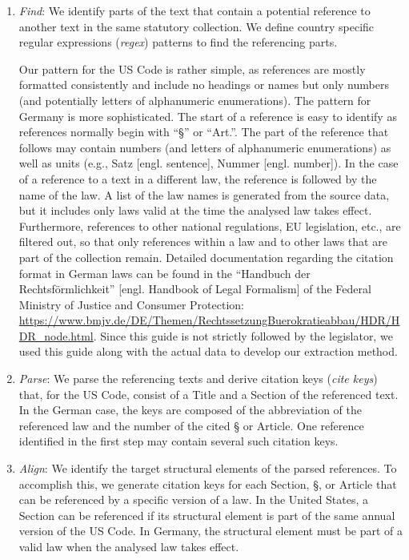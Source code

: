 \begin{enumerate}

\item \emph{Find}: We identify parts of the text that contain a potential reference to another text in the same statutory collection. 
We define country specific regular expressions (\emph{regex}) patterns to find the referencing parts. 

Our pattern for the US Code is rather simple, 
as references are mostly formatted consistently and include no headings or names but only numbers (and potentially letters of alphanumeric enumerations). 
The pattern for Germany is more sophisticated. 
The start of a reference is easy to identify as references normally begin with ``§'' or ``Art.''. 
The part of the reference that follows may contain numbers (and letters of alphanumeric enumerations) as well as units (e.g., Satz [engl. sentence], Nummer [engl. number]). 
In the case of a reference to a text in a different law, the reference is followed by the name of the law. 
A list of the law names is generated from the source data, 
but it includes only laws valid at the time the analysed law takes effect. 
Furthermore, 
references to other national regulations, EU legislation, etc., are filtered out,
so that only references within a law and to other laws that are part of the collection remain. 
Detailed documentation regarding the citation format in German laws can be found in the ``Handbuch der Rechtsförmlichkeit'' [engl. Handbook of Legal Formalism] of the Federal Ministry of Justice and Consumer Protection: \url{https://www.bmjv.de/DE/Themen/RechtssetzungBuerokratieabbau/HDR/HDR_node.html}.
Since this guide is not strictly followed by the legislator, 
we used this guide along with the actual data to develop our extraction method.

\item \emph{Parse}: We parse the referencing texts and derive citation keys (\emph{cite keys}) that, for the US Code, consist of a Title and a Section of the referenced text.
In the German case, the keys are composed of the abbreviation of the referenced law and the number of the cited § or Article.
One reference identified in the first step may contain several such citation keys.

\item \emph{Align}: We identify the target structural elements of the parsed references.
To accomplish this, we generate citation keys for each Section, 
§, or Article that can be referenced by a specific version of a law.
In the United States, a Section can be referenced if its structural element is part of the same annual version of the US Code.
In Germany, the structural element must be part of a valid law when the analysed law takes effect.
\end{enumerate}

